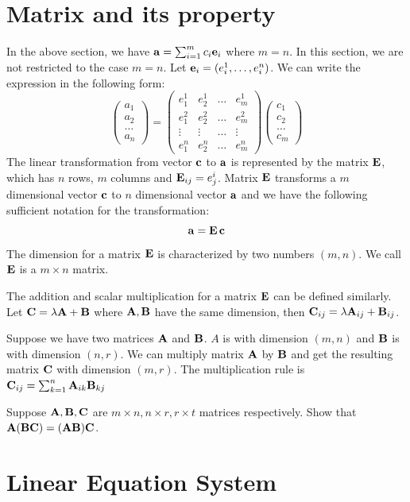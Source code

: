 \section{Matrix and its property}
In the above section, we have $\mathbf{a} = \sum_{i=1}^m c_i \mathbf{e}_i$ where $m=n$. In this section, we are not restricted to the case $m=n$. Let $\mathbf{e}_i = (e_i^1, \dots, e_i^n)$. We can write the expression in the following form:
\begin{equation}
	\begin{pmatrix} a_1 \\ a_2 \\ \dots \\ a_n \end{pmatrix}
	 = \begin{pmatrix} e^1_1 & e^1_2 & \dots & e^1_m \\ e^2_1 & e^2_2 & \dots & e^2_m \\ 
	 	\vdots & \vdots & \dots & \vdots \\
	 	 e^n_1 & e^n_2 & \dots & e^n_m \end{pmatrix} \begin{pmatrix} c_1 \\ c_2 \\ \dots \\ c_m \end{pmatrix}
\end{equation}
The linear transformation from vector $\mathbf{c}$ to $\mathbf{a}$ is represented by the matrix $\mathbf{E}$, which has $n$ rows, $m$ columns and $\mathbf{E}_{ij} = e^i_j$.
Matrix $\mathbf{E}$ transforms a $m$ dimensional vector $\mathbf{c}$ to $n$ dimensional vector $\mathbf{a}$ and 
we have the following sufficient notation for the transformation:
\begin{equation}
\mathbf{a} = \mathbf{E}\, \mathbf{c}
\end{equation}
The dimension for a matrix $\mathbf{E}$ is characterized by two numbers $(m,n)$. We call $\mathbf{E}$ is a $m\times n$ matrix.

The addition and scalar multiplication for a matrix $\mathbf{E}$ can be defined similarly. Let $\mathbf{C} = \lambda \mathbf{A} + \mathbf{B}$ where $\mathbf{A}, \mathbf{B}$ have the same dimension, then $\mathbf{C}_{ij} = \lambda \mathbf{A}_{ij} + \mathbf{B}_{ij}$.

Suppose we have two matrices $\mathbf{A}$ and $\mathbf{B}$.  $A$ is with dimension $(m,n)$ and $\mathbf{B}$ is with dimension $(n,r)$. We can multiply matrix $\mathbf{A}$ by $\mathbf{B}$ and get the resulting matrix $\mathbf{C}$ with dimension $(m, r)$. The multiplication rule is $\mathbf{C}_{ij} = \sum_{k=1}^n \mathbf{A}_{ik}\mathbf{B}_{kj}$

\begin{exercise}
Suppose $\mathbf{A}, \mathbf{B}, \mathbf{C}$ are $m\times n, n\times r, r \times t$ matrices respectively.	Show that $\mathbf{A}(\mathbf{B}\mathbf{C}) = (\mathbf{A}\mathbf{B})\mathbf{C}$.
\end{exercise}
\section{Linear Equation System}